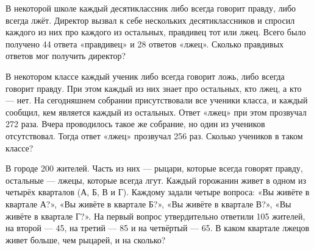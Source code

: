  В некоторой школе каждый десятиклассник либо всегда говорит правду, либо всегда лжёт. Директор вызвал к себе нескольких десятиклассников и спросил каждого из них про каждого из остальных, правдивец тот или лжец. Всего было получено 44 ответа «правдивец» и 28 ответов «лжец». Сколько правдивых ответов мог получить директор?

 В некотором классе каждый ученик либо всегда говорит ложь, либо всегда говорит правду. При этом каждый из них знает про остальных, кто лжец, а кто — нет. На сегодняшнем собрании присутствовали все ученики класса, и каждый сообщил, кем является каждый из остальных. Ответ «лжец» при этом прозвучал 272 раза. Вчера проводилось такое же собрание, но один из учеников отсутствовал. Тогда ответ «лжец» прозвучал 256 раз. Сколько учеников в таком классе?
  
 В городе 200 жителей. Часть из них — рыцари, которые всегда говорят
правду, остальные — лжецы, которые всегда лгут. Каждый горожанин живет в одном из четырёх кварталов (А, Б, В и Г). Каждому задали четыре вопроса: «Вы живёте в квартале А?», «Вы
живёте в квартале Б?», «Вы живёте в квартале В?», «Вы живёте в квартале Г?». На первый вопрос утвердительно ответили 105 жителей, на второй — 45, на третий — 85 и на четвёртый — 65.
В каком квартале лжецов живет больше, чем рыцарей, и на сколько?